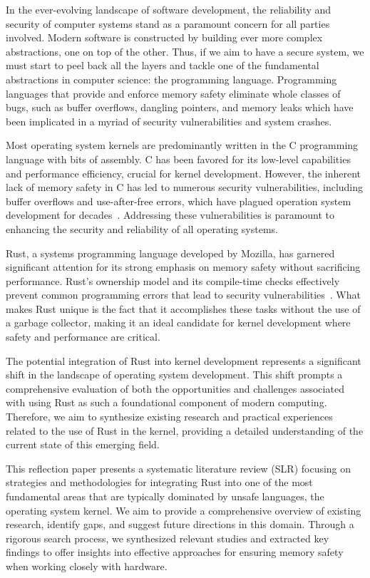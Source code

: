 \documentclass[sigconf]{acmart}
\begin{document}
In the ever-evolving landscape of software development, the reliability and security of computer
systems stand as a paramount concern for all parties involved. Modern software is constructed by
building ever more complex abstractions, one on top of the other. Thus, if we aim to have a secure
system, we must start to peel back all the layers and tackle one of the fundamental abstractions in
computer science: the programming language. Programming languages that provide and enforce memory
safety eliminate whole classes of bugs, such as buffer overflows, dangling pointers, and memory leaks
which have been implicated in a myriad of security vulnerabilities and system crashes.

Most operating system kernels are predominantly written in the C programming language with bits of
assembly. C has been favored for its low-level capabilities and performance efficiency, crucial for
kernel development. However, the inherent lack of memory safety in C has led to numerous security
vulnerabilities, including buffer overflows and use-after-free errors, which have plagued operation
system development for decades~\cite{MSRC_Team2019-bf}. Addressing these vulnerabilities is
paramount to enhancing the security and reliability of all operating systems.

Rust, a systems programming language developed by Mozilla, has garnered significant attention for
its strong emphasis on memory safety without sacrificing performance. Rust's ownership model and its
compile-time checks effectively prevent common programming errors that lead to security
vulnerabilities~\cite{Klabnik2024-id}. What makes Rust unique is the fact that it accomplishes these tasks without the use of a garbage collector, making it an ideal candidate for kernel development where safety and performance are critical.

The potential integration of Rust into kernel development represents a significant shift in the
landscape of operating system development. This shift prompts a comprehensive evaluation of both the
opportunities and challenges associated with using Rust as such a foundational component of modern
computing. Therefore, we aim to synthesize existing research and practical
experiences related to the use of Rust in the kernel, providing a detailed understanding of
the current state of this emerging field.

This reflection paper presents a systematic literature review (SLR) focusing on strategies and methodologies
for integrating Rust into one of the most fundamental areas that are typically dominated by unsafe
languages, the operating system kernel. We aim to provide a comprehensive overview of
existing research, identify gaps, and suggest future directions in this domain. Through a rigorous
search process, we synthesized relevant studies and extracted key findings to offer insights into
effective approaches for ensuring memory safety when working closely with hardware.
\end{document}
